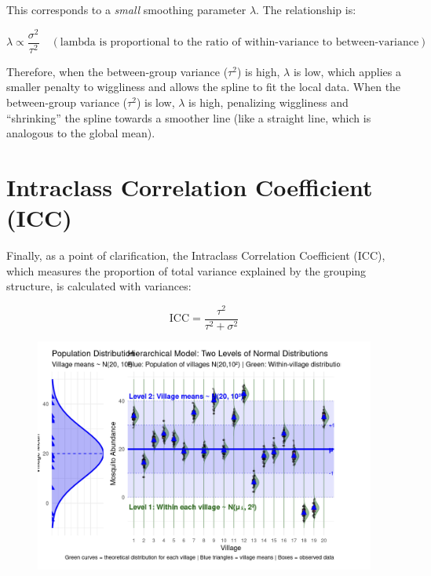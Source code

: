 \documentclass{article}
\begin{document}
 This corresponds to a \emph{small} smoothing parameter $\lambda$. The relationship is:

\begin{equation*}
\lambda \propto \frac{\sigma^2}{\tau^2} \quad (\text{lambda is proportional to the ratio of within-variance to between-variance})
\end{equation*}

Therefore, when the between-group variance ($\tau^2$) is high, $\lambda$ is low, which applies a smaller penalty to wiggliness and allows the spline to fit the local data. When the between-group variance ($\tau^2$) is low, $\lambda$ is high, penalizing wiggliness and ``shrinking'' the spline towards a smoother line (like a straight line, which is analogous to the global mean).

\section*{Intraclass Correlation Coefficient (ICC)}

Finally, as a point of clarification, the Intraclass Correlation Coefficient (ICC), which measures the proportion of total variance explained by the grouping structure, is calculated with variances:

\begin{equation*}
\text{ICC} = \frac{\tau^2}{\tau^2 + \sigma^2}
\end{equation*}

\begin{figure}
    \centering
    \includegraphics[width=1\linewidth]{overviews//general-cheatsheet/image.png}
\end{figure}
\end{document}
